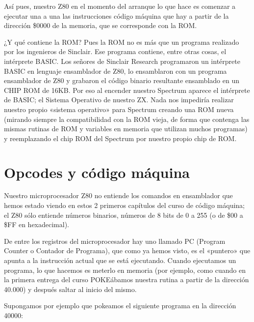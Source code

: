 \documentclass[letterpaper,10pt,spanish]{sphinxmanual}
\begin{document}
Así pues, nuestro Z80 en el momento del arranque lo que hace es comenzar a ejecutar una a una las instrucciones código máquina que hay a partir de la dirección \$0000 de la memoria, que se corresponde con la ROM.

¿Y qué contiene la ROM? Pues la ROM no es más que un programa realizado por los ingenieros de Sinclair. Ese programa contiene, entre otras cosas, el intérprete BASIC. Los señores de Sinclair Research programaron un intérprete BASIC en lenguaje ensamblador de Z80, lo ensamblaron con un programa ensamblador de Z80 y grabaron el código binario resultante ensamblado en un CHIP ROM de 16KB. Por eso al encender nuestro Spectrum aparece el intérprete de BASIC; el Sistema Operativo de nuestro ZX. Nada nos impediría realizar nuestro propio «sistema operativo» para Spectrum creando una ROM nueva (mirando siempre la compatibilidad con la ROM vieja, de forma que contenga las mismas rutinas de ROM y variables en memoria que utilizan muchos programas) y reemplazando el chip ROM del Spectrum por nuestro propio chip de ROM.


\section{Opcodes y código máquina}
\label{\detokenize{03_arquitectura/arquitectura:opcodes-y-codigo-maquina}}
Nuestro microprocesador Z80 no entiende los comandos en ensamblador que hemos estado viendo en estos 2 primeros capítulos del curso de código máquina; el Z80 sólo entiende números binarios, números de 8 bits de 0 a 255 (o de \$00 a \$FF en hexadecimal).

De entre los registros del microprocesador hay uno llamado PC (Program Counter o Contador de Programa), que como ya hemos visto, es el «puntero» que apunta a la instrucción actual que se está ejecutando. Cuando ejecutamos un programa, lo que hacemos es meterlo en memoria (por ejemplo, como cuando en la primera entrega del curso POKEábamos nuestra rutina a partir de la dirección 40.000) y después saltar al inicio del mismo.

Supongamos por ejemplo que pokeamos el siguiente programa en la dirección 40000:

\begin{sphinxVerbatim}[commandchars=\\\{\}]
  
 
  
 
  
\end{sphinxVerbatim}
\end{document}
